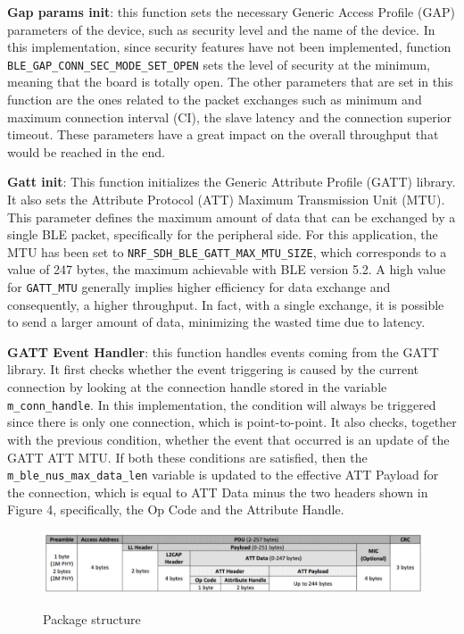 \documentclass{Configuration_Files/PoliMi3i_thesis}
\begin{document}
\textbf{Gap params init}: this function sets the necessary Generic Access Profile (GAP) parameters of the device, such as security level and the name of the device. In this implementation, since security features have not been implemented, function \texttt{BLE\_GAP\_CONN\_SEC\_MODE\_SET\_OPEN} sets the level of security at the minimum, meaning that the board is totally open. The other parameters that are set in this function are the ones related to the packet exchanges such as minimum and maximum connection interval (CI), the slave latency and the connection superior timeout. These parameters have a great impact on the overall throughput that would be reached in the end.

\textbf{Gatt init}: This function initializes the Generic Attribute Profile (GATT) library. It also sets the Attribute Protocol (ATT) Maximum Transmission Unit (MTU). This parameter defines the maximum amount of data that can be exchanged by a single BLE packet, specifically for the peripheral side. For this application, the MTU has been set to \texttt{NRF\_SDH\_BLE\_GATT\_MAX\_MTU\_SIZE}, which corresponds to a value of 247 bytes, the maximum achievable with BLE version 5.2. A high value for \texttt{GATT\_MTU} generally implies higher efficiency for data exchange and consequently, a higher throughput. In fact, with a single exchange, it is possible to send a larger amount of data, minimizing the wasted time due to latency.

\textbf{GATT Event Handler}: this function handles events coming from the GATT library. It first checks whether the event triggering is caused by the current connection by looking at the connection handle stored in the variable \texttt{m\_conn\_handle}. In this implementation, the condition will always be triggered since there is only one connection, which is point-to-point. It also checks, together with the previous condition, whether the event that occurred is an update of the GATT ATT MTU. If both these conditions are satisfied, then the \texttt{m\_ble\_nus\_max\_data\_len} variable is updated to the effective ATT Payload for the connection, which is equal to ATT Data minus the two headers shown in Figure 4, specifically, the Op Code and the Attribute Handle.

\begin{figure}[H]
	\includegraphics[scale=0.3]{Previous Implementation/Screenshot 2024-08-15 at 11.00.56.png}
	\centering
    \label{prev_4}
    \caption{Package structure}
\end{figure}
\end{document}
